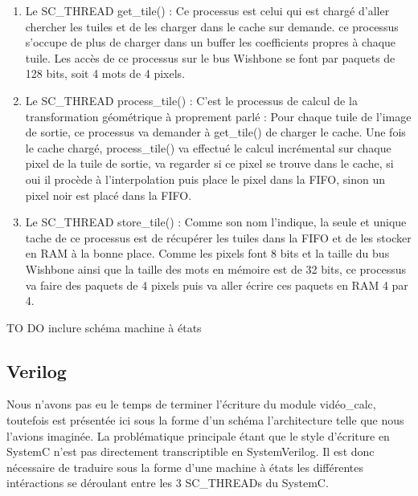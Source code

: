 \documentclass[a4paper,12pt]{report}
\begin{document}
{{\begin{enumerate}

\item Le SC\_THREAD get\_tile() : Ce processus est celui qui est chargé d'aller chercher les tuiles et de les charger dans le cache sur demande. ce processus s'occupe de plus de charger dans un buffer les coefficients propres à chaque tuile. Les accès de ce processus sur le bus Wishbone se font par paquets de 128 bits, soit 4 mots de 4 pixels.


\item Le SC\_THREAD process\_tile() : C'est le processus de calcul de la transformation géométrique à proprement parlé : Pour chaque tuile de l'image de sortie, ce processus va demander à get\_tile() de charger le cache. Une fois le cache chargé, process\_tile() va effectué le calcul incrémental sur chaque pixel de la tuile de sortie, va regarder si ce pixel se trouve dans le cache, si oui il procède à l'interpolation puis place le pixel dans la FIFO, sinon un pixel noir est placé dans la FIFO.


\item Le SC\_THREAD store\_tile() : Comme son nom l'indique, la seule et unique tache de ce processus est de récupérer les tuiles dans la FIFO et de les stocker en RAM à la bonne place. Comme les  pixels font 8 bits et la taille du bus Wishbone ainsi que la taille des mots en mémoire  est de 32 bits, ce processus va faire des paquets de 4 pixels puis va aller écrire ces paquets en RAM 4 par 4.
\end{enumerate}

TO DO inclure schéma machine à états

	\subsection{Verilog}
Nous n'avons pas eu le temps de terminer l'écriture du module vidéo\_calc, toutefois est présentée ici sous la forme d'un schéma l'architecture telle que nous l'avions imaginée. La problématique principale étant que le style d'écriture en SystemC n'est pas directement transcriptible en SystemVerilog. Il est donc nécessaire de traduire sous la forme d'une machine à états les différentes intéractions se déroulant entre les 3 SC\_THREADs du SystemC.

}}
\end{document}
